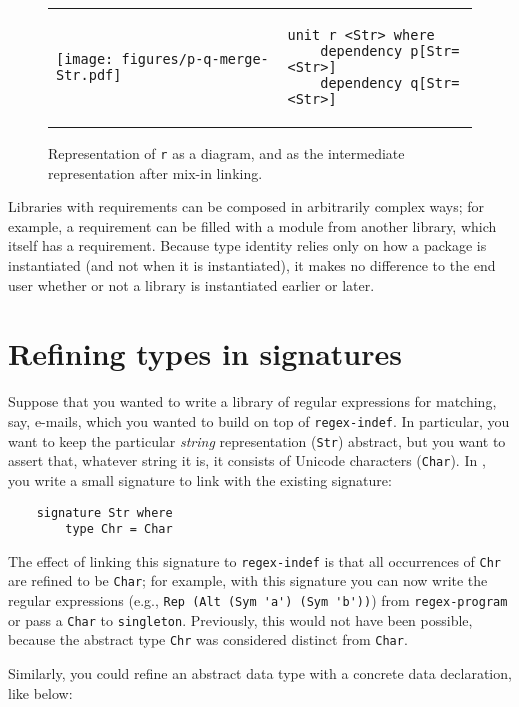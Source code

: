 \begin{figure}
\begin{tabular}{p{} p{}}
\center\texttt{[image: figures/p-q-merge-Str.pdf]}
&
\vspace{2em}
\begin{lstlisting}
unit r <Str> where
    dependency p[Str=<Str>]
    dependency q[Str=<Str>]
\end{lstlisting}
\end{tabular}
\caption{Representation of \texttt{r} as a diagram, and as the intermediate
representation after mix-in linking.}
\label{fig:signature-merging-interp}
\end{figure}

Libraries with requirements can be composed in arbitrarily complex ways;
for example, a requirement can be filled with a module from another library,
which itself has a requirement.  Because type identity relies
only on how a package is instantiated (and not when it is instantiated),
it makes no difference to the end user whether or not a library
is instantiated earlier or later.

\section{Refining types in signatures}

Suppose that you wanted to write a library of regular expressions for
matching, say, e-mails, which you wanted to build on top of
\texttt{regex-indef}.  In particular, you want to keep the particular
\emph{string} representation (\verb|Str|) abstract, but you want
to assert that, whatever string it is, it consists of Unicode
characters (\verb|Char|).  In \Backpack{}, you
write a small signature to link with the existing signature:

\begin{lstlisting}
    signature Str where
        type Chr = Char
\end{lstlisting}

\noindent
The effect of linking this signature to \verb|regex-indef| is that
all occurrences of \verb|Chr| are refined to be \verb|Char|;
for example, with this signature you can now write the regular
expressions (e.g., \verb|Rep (Alt (Sym 'a') (Sym 'b'))|) from
\verb|regex-program| or pass a \verb|Char| to \verb|singleton|.
Previously, this would not have been possible, because the
abstract type \verb|Chr| was considered distinct from \verb|Char|.

Similarly, you could refine an abstract data type with a concrete
data declaration, like below:

